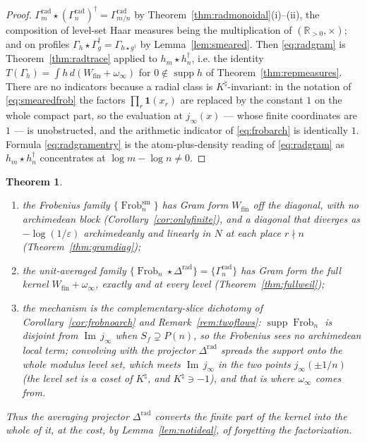 \documentclass[11pt]{amsart}
\newtheorem{theorem}{Theorem}[section]
\theoremstyle{definition}
\theoremstyle{remark}
\newcommand{\R}{\mathbb R}
\newcommand{\Iml}{\operatorname{Im}}
\newcommand{\Frob}{\operatorname{Frob}}
\newcommand{\supp}{\operatorname{supp}}
\newcommand{\Knat}{K^{\natural}}
\newcommand{\Wfin}{W_{\mathrm{fin}}}
\begin{document}
\begin{proof}
$\Gamma_m^{\mathrm{rad}}\star(\Gamma_n^{\mathrm{rad}})^\dagger
=\Gamma_{m/n}^{\mathrm{rad}}$ by Theorem~\ref{thm:radmonoidal}(i)--(ii), the
composition of level-set Haar measures being the multiplication of
$(\R_{>0},\times)$; and on profiles $\Gamma_h\star\Gamma_g^\dagger
=\Gamma_{h\star g^\dagger}$ by Lemma~\ref{lem:smeared}. Then \eqref{eq:radgram}
is Theorem~\ref{thm:radtrace} applied to $h_m\star h_n^\dagger$, i.e. the
identity $T(\Gamma_h)=\int h\,d(\Wfin+\omega_\infty)$ for
$0\notin\supp h$ of Theorem~\ref{thm:repmeasures}. There are no indicators
because a radial class is $\Knat$-invariant: in the notation of
\eqref{eq:smearedfrob} the factors $\prod_r\mathbf 1(x_r)$ are replaced by the
constant $1$ on the whole compact part, so the evaluation at $j_\infty(x)$ ---
whose finite coordinates are $1$ --- is unobstructed, and the arithmetic
indicator of \eqref{eq:frobarch} is identically $1$. Formula
\eqref{eq:radgramentry} is the atom-plus-density reading of \eqref{eq:radgram}
as $h_m\star h_n^\dagger$ concentrates at $\log m-\log n\ne0$.
\end{proof}

\begin{theorem}\label{thm:twohalves}
\begin{enumerate}
\item[(i)] the Frobenius family $\{\Frob_n^{\mathrm{sm}}\}$ has Gram form
$\Wfin$ off the diagonal, with no archimedean block
(Corollary~\ref{cor:onlyfinite}), and a diagonal that diverges as
$-\log(1/\varepsilon)$ archimedeanly and linearly in $N$ at each place
$r\nmid n$ (Theorem~\ref{thm:gramdiag});
\item[(ii)] the unit-averaged family
$\{\Frob_n\star\Delta^{\mathrm{rad}}\}=\{\Gamma_n^{\mathrm{rad}}\}$ has Gram
form the full kernel $\Wfin+\omega_\infty$, exactly and at every level
(Theorem~\ref{thm:fullweil});
\item[(iii)] the mechanism is the complementary-slice dichotomy of
Corollary~\ref{cor:frobnoarch} and Remark~\ref{rem:twoflows}: $\supp\Frob_n$ is
disjoint from $\Iml\,j_\infty$ when $S_f\supsetneq P(n)$, so the Frobenius sees
no archimedean local term; convolving with the projector
$\Delta^{\mathrm{rad}}$ spreads the support onto the whole modulus level set,
which meets $\Iml\,j_\infty$ in the two points $j_\infty(\pm1/n)$ (the
level set is a coset of $\Knat$, and $\Knat\ni-1$), and that is
where $\omega_\infty$ comes from.
\end{enumerate}
Thus the averaging projector $\Delta^{\mathrm{rad}}$ converts the finite part
of the kernel into the whole of it, at the cost, by Lemma~\ref{lem:notideal},
of forgetting the factorization.
\end{theorem}
\end{document}
